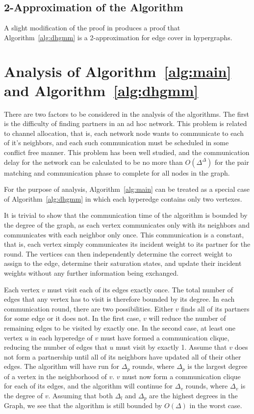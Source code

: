 \documentclass[conference, 11pt]{IEEEtran}
\theoremstyle{definition}
\begin{document}
\subsection{2-Approximation of the Algorithm}
A slight modification of the proof in \cite{Gonzalez1995129} produces a proof that Algorithm~\ref{alg:dhgmm} is a 2-approximation for edge cover in hypergraphs.


\section{Analysis of Algorithm~\ref{alg:main} and Algorithm~\ref{alg:dhgmm}}
There are two factors to be considered in the analysis of the algorithms. The first is the difficulty of finding partners in an ad hoc network. This problem is related to channel allocation, that is, each network node wants to communicate to each of it's neighbors, and each such communication must be scheduled in some conflict free manner. This problem has been well studied, and the communication delay for the network can be calculated to be no more than $O(\Delta^{\Delta})$ for the pair matching and communication phase to complete for all nodes in the graph.\cite{4053985}

For the purpose of analysis, Algorithm~\ref{alg:main} can be treated as a special case of Algorithm~\ref{alg:dhgmm} in which each hyperedge contains only two vertexes.
 
It is trivial to show that the communication time of the algorithm is bounded by the degree of the graph, as each vertex communicates only with its neighbors and communicates with each neighbor only once. This communication is a constant, that is, each vertex simply communicates its incident weight to its partner for the round. The vertices can then independently determine the correct weight to assign to the edge, determine their saturation states, and update their incident weights without any further information being exchanged.

Each vertex $v$ must visit each of its edges exactly once. The total number of edges that any vertex has to visit is therefore bounded by its degree. In each communication round, there are two possibilities. Either $v$ finds all of its partners for some edge or it does not. In the first case, $v$ will reduce the number of remaining edges to be visited by exactly one. In the second case, at least one vertex $u$ in each hyperedge of $v$ must have formed a communication clique, reducing the number of edges that $u$ must visit by exactly 1. Assume that $v$ does not form a partnership until all of its neighbors have updated all of their other edges. The algorithm will have run for $\Delta_p$ rounds, where $\Delta_p$ is the largest degree of a vertex in the neighborhood of $v$. $v$ must now form a communication clique for each of its edges, and the algorithm will continue for $\Delta_v$ rounds, where $\Delta_v$ is the degree of $v$. Assuming that both $\Delta_l$ and $\Delta_p$ are the highest degrees in the Graph, we see that the algorithm is still bounded by $O(\Delta)$ in the worst case.
\end{document}
